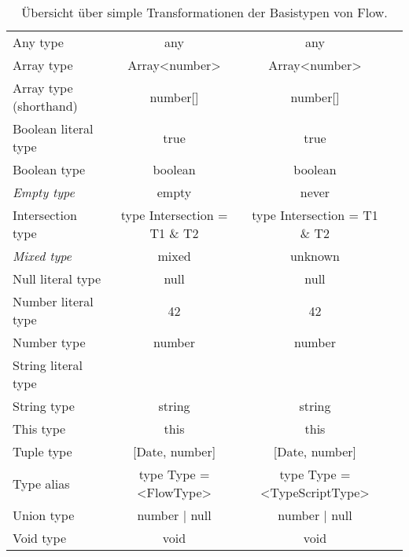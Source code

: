 \begin{table}[tbh]
  \footnotesize
  \begin{tabu} to 
    \midrule
      &             &          & {} \\
    \midrule
    Any type                & any                           & any                              & {} \\
    Array type              & Array<number>                 & Array<number>                    & {} \\
    Array type (shorthand)  & number[]                      & number[]                         & {} \\
    Boolean literal type    & true                          & true                             & {} \\
    Boolean type            & boolean                       & boolean                          & {} \\
    \textit{Empty type}     & empty                         & never                            & {} \\
    Intersection type       & type Intersection = T1 \& T2  & type Intersection = T1 \& T2     & {} \\
    \textit{Mixed type}     & mixed                         & unknown                          & {} \\
    Null literal type       & null                          & null                             & {} \\
    Number literal type     & 42                            & 42                               & {} \\
    Number type             & number                        & number                           & {} \\
    String literal type     &                  &                     &  {} \\
    String type             & string                        & string                           & {} \\
    This type               & this                          & this                             & {} \\
    Tuple type              & {[}Date, number{]}            & {[}Date, number{]}               & {} \\
    Type alias              & type Type = <FlowType>        & type Type = <TypeScriptType>     & {} \\
    Union type              & number | null                 & number | null                    & {} \\
    Void type               & void                          & void                             & {} \\
    \midrule
  \end{tabu}
  \caption{Übersicht über simple Transformationen der Basistypen von Flow.}
  \label{tab:transformation-base-types-simple}
\end{table}


